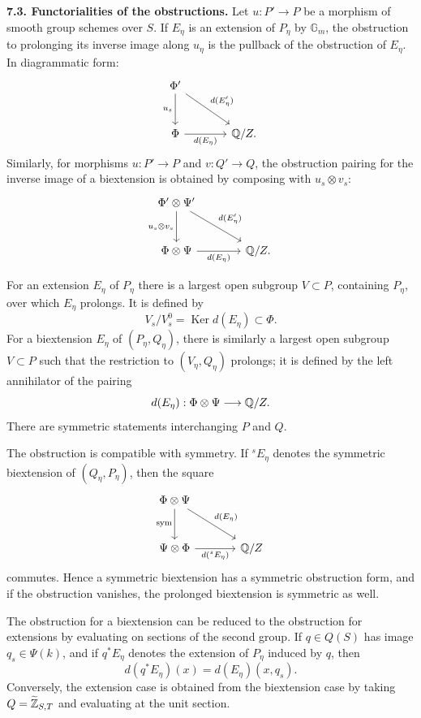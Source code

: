 \documentclass[11pt]{article}
\providecommand{\Ker}{\operatorname{Ker}}
\providecommand{\Gm}{\mathbb G_m}
\begin{document}
\textbf{7.3. Functorialities of the obstructions.}  Let \(u:P'\to P\) be a morphism of smooth group schemes over \(S\).  If \(E_\eta\) is an extension of \(P_\eta\) by \(\Gm\), the obstruction to prolonging its inverse image along \(u_\eta\) is the pullback of the obstruction of \(E_\eta\).  In diagrammatic form:
\[
\begin{tikzcd}[column sep=large,row sep=large]
\Phi' \arrow[d,"u_s"'] \arrow[dr,"d(E'_\eta)"]&\\
\Phi \arrow[r,"d(E_\eta)"']&\QQ/Z.
\end{tikzcd}
\]
Similarly, for morphisms \(u:P'\to P\) and \(v:Q'\to Q\), the obstruction pairing for the inverse image of a biextension is obtained by composing with \(u_s\otimes v_s\):
\[
\begin{tikzcd}[column sep=large,row sep=large]
\Phi'\otimes\Psi' \arrow[d,"u_s\otimes v_s"'] \arrow[dr,"d(E'_\eta)"]&\\
\Phi\otimes\Psi \arrow[r,"d(E_\eta)"']&\QQ/Z.
\end{tikzcd}
\]

For an extension \(E_\eta\) of \(P_\eta\) there is a largest open subgroup \(V\subset P\), containing \(P_\eta\), over which \(E_\eta\) prolongs.  It is defined by
\[
  V_s/V_s^0=\Ker d(E_\eta)\subset \Phi.
\]
For a biextension \(E_\eta\) of \((P_\eta,Q_\eta)\), there is similarly a largest open subgroup \(V\subset P\) such that the restriction to \((V_\eta,Q_\eta)\) prolongs; it is defined by the left annihilator of the pairing
\[
  d(E_\eta):\Phi\otimes\Psi\longrightarrow\mathbb Q/Z.
\]
There are symmetric statements interchanging \(P\) and \(Q\).

The obstruction is compatible with symmetry.  If \({}^sE_\eta\) denotes the symmetric biextension of \((Q_\eta,P_\eta)\), then the square
\[
\begin{tikzcd}[column sep=large,row sep=large]
\Phi\otimes\Psi \arrow[d,"\mathrm{sym}"'] \arrow[dr,"d(E_\eta)"]&\\
\Psi\otimes\Phi \arrow[r,"d({}^sE_\eta)"']&\QQ/Z
\end{tikzcd}
\]
commutes.  Hence a symmetric biextension has a symmetric obstruction form, and if the obstruction vanishes, the prolonged biextension is symmetric as well.

The obstruction for a biextension can be reduced to the obstruction for extensions by evaluating on sections of the second group.  If \(q\in Q(S)\) has image \(q_s\in\Psi(k)\), and if \(q^*E_\eta\) denotes the extension of \(P_\eta\) induced by \(q\), then
\[
  d(q^*E_\eta)(x)=d(E_\eta)(x,q_s).
\]
Conversely, the extension case is obtained from the biextension case by taking \(Q=\widetilde{\mathbb Z}_{S,T}\) and evaluating at the unit section.
\end{document}

